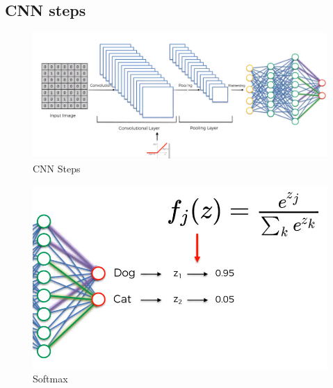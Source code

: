 \documentclass[]{report}
\begin{document}
\subsection{CNN steps}
\begin{figure}[H]
\centering
\includegraphics[scale=0.5]{cnn-steps-1}
\caption{CNN Steps}
\end{figure}
\begin{figure}[H]
\centering
\includegraphics[scale=0.6]{cnn-steps-2}
\caption{Softmax}
\end{figure}
\end{document}
